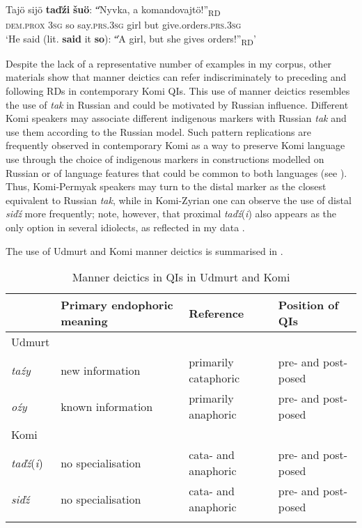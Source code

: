 \documentclass[output=paper,colorlinks,citecolor=brown]{langscibook}
\begin{document}
\ex\label{ex:teptiuk:20d}
\gll Tajö sijö \textbf{taďźi} \textbf{šuö}: \|“Nyvka, a komandovajtö!”\|\textsubscript{RD}\\
 \textsc{dem}.\textsc{prox} \textsc{3sg} so say.\textsc{prs}.3\textsc{sg} {\db}{\db}girl but give.orders.\textsc{prs.3sg}\\
\glt ‘He said (lit. \textbf{said} it \textbf{so}): \|“A girl, but she gives orders!”\|\textsubscript{RD}’
\z
\z

Despite the lack of a representative number of examples in my corpus, other materials show that manner deictics can refer indiscriminately to preceding and following RDs in contemporary Komi QIs. This use of manner deictics resembles the use of \textit{tak} in Russian and could be motivated by Russian influence. Different Komi speakers may associate different indigenous markers with Russian \textit{tak}  and use them according to the Russian model. Such pattern replications are frequently observed in contemporary Komi as a way to preserve Komi language use through the choice of indigenous markers in constructions modelled on Russian or of language features that could be common to both languages (see \citealt{Leinonen2006,Leinonen2009}). Thus, Komi-Permyak speakers may turn to the distal marker as the closest equivalent to Russian \textit{tak}, while in Komi-Zyrian one can observe the use of distal \textit{siďź} more frequently; note, however, that proximal \textit{taďź}(\textit{i}) also appears as the only option in several idiolects, as reflected in my data .

The use of Udmurt and Komi manner deictics is summarised in .

\begin{table}
\begin{tabularx}{\textwidth}{lQll}
\lsptoprule
& \textbf{Primary endophoric meaning} & \textbf{Reference} & \textbf{Position of QIs}\\
\midrule
Udmurt & & & \\
\midrule 
\textit{taźy} & new information & primarily cataphoric & pre- and post-posed\\
\textit{oźy} & known information & primarily anaphoric & pre- and post-posed\\

\tablevspace
Komi & & & \\
\midrule
\textit{taďź}(\textit{i}) & no specialisation & cata- and anaphoric & pre- and post-posed\\ \textit{siďź} & no specialisation & cata- and anaphoric & pre- and post-posed\\ 
\lspbottomrule
\end{tabularx}
\caption{Manner deictics in QIs in Udmurt and Komi}\label{tab:teptiuk:3}
\end{table}
\end{document}
